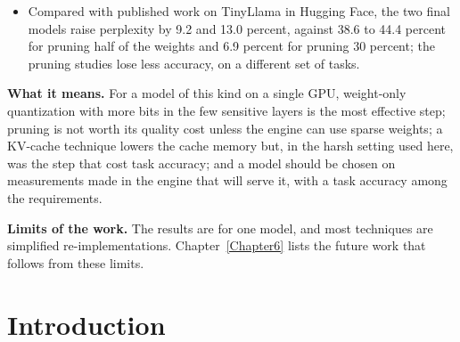 \documentclass[
11pt, %
english, %
singlespacing, %
headsepline, %
]{MastersDoctoralThesis} %
\begin{document}
\begin{itemize}
  \item Compared with published work on TinyLlama in Hugging Face, the two final models raise perplexity by 9.2 and 13.0 percent, against 38.6 to 44.4 percent for pruning half of the weights and 6.9 percent for pruning 30 percent; the pruning studies lose less accuracy, on a different set of tasks.
\end{itemize}

\noindent\textbf{What it means.} For a model of this kind on a single GPU, weight-only quantization with more bits in the few sensitive layers is the most effective step; pruning is not worth its quality cost unless the engine can use sparse weights; a KV-cache technique lowers the cache memory but, in the harsh setting used here, was the step that cost task accuracy; and a model should be chosen on measurements made in the engine that will serve it, with a task accuracy among the requirements.

\medskip\noindent\textbf{Limits of the work.} The results are for one model, and most techniques are simplified re-implementations. Chapter~\ref{Chapter6} lists the future work that follows from these limits.

\cleardoublepage





\tableofcontents %

\listoffigures %

\listoftables %




\mainmatter %

\pagestyle{thesis} %


\clearpage
\chapter{Introduction}
\label{Chapter1}
\end{document}
